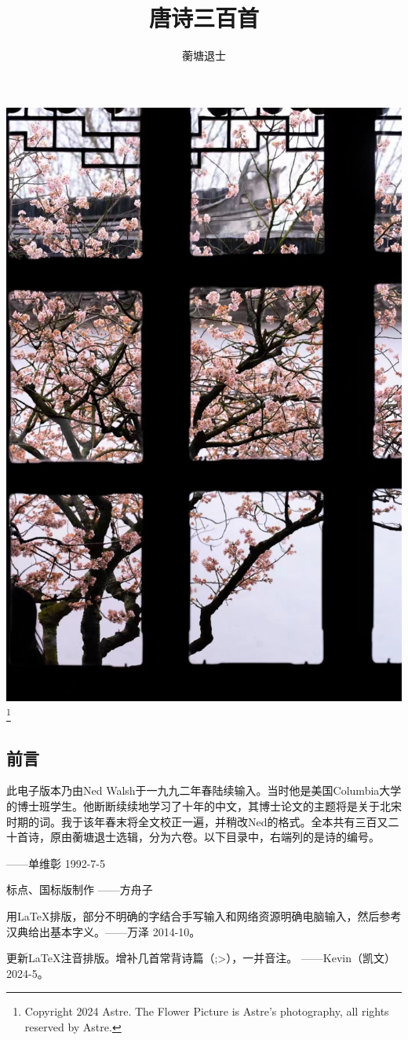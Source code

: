 \documentclass[12pt,oneside,a5paper]{book}
\begin{document}
\frontmatter

\title{唐诗三百首}
\author{蘅塘退士}
\maketitle

\begin{center}
    \includegraphics[width=.5\textwidth,height=.5\textheight,keepaspectratio]{题照拙句.jpg}\footnote[0]{Copyright 2024 Astre. The Flower Picture is Astre's photography, all rights reserved by Astre.}
\end{center}

\begin{common-format}
\chapter*{前言}

此电子版本乃由Ned Walsh于一九九二年春陆续输入。当时他是美国Columbia大学的博士班学生。他断断续续地学习了十年的中文，其博士论文的主题将是关于北宋时期的词。我于该年春末将全文校正一遍，并稍改Ned的格式。全本共有三百又二十首诗，原由蘅塘退士选辑，分为六卷。以下目录中，右端列的是诗的编号。

——单维彰 1992-7-5

标点、国标版制作 ——方舟子

用\LaTeX 排版，部分不明确的字结合手写输入和网络资源明确电脑输入，然后参考汉典给出基本字义。——万泽 2014-10。

更新\LaTeX 注音排版。增补几首常背诗篇（;>），一并音注。 ——Kevin（凯文） 2024-5。


\end{common-format}
\end{document}

